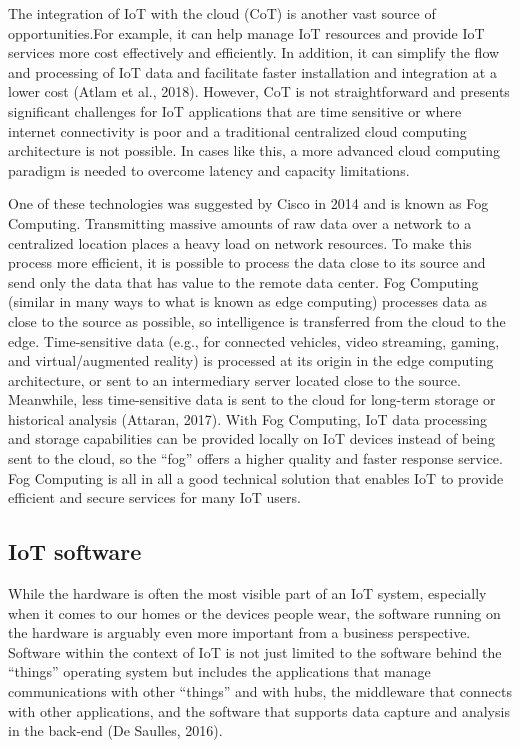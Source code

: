 \documentclass[
  letterpaper,
  DIV=11,
  numbers=noendperiod]{scrreprt}
\begin{document}
The integration of IoT with the cloud (CoT) is another vast source of
opportunities.For example, it can help manage IoT resources and provide
IoT services more cost effectively and efficiently. In addition, it can
simplify the flow and processing of IoT data and facilitate faster
installation and integration at a lower cost (Atlam et al., 2018).
However, CoT is not straightforward and presents significant challenges
for IoT applications that are time sensitive or where internet
connectivity is poor and a traditional centralized cloud computing
architecture is not possible. In cases like this, a more advanced cloud
computing paradigm is needed to overcome latency and capacity
limitations.

One of these technologies was suggested by Cisco in 2014 and is known as
Fog Computing. Transmitting massive amounts of raw data over a network
to a centralized location places a heavy load on network resources. To
make this process more efficient, it is possible to process the data
close to its source and send only the data that has value to the remote
data center. Fog Computing (similar in many ways to what is known as
edge computing) processes data as close to the source as possible, so
intelligence is transferred from the cloud to the edge. Time-sensitive
data (e.g., for connected vehicles, video streaming, gaming, and
virtual/augmented reality) is processed at its origin in the edge
computing architecture, or sent to an intermediary server located close
to the source. Meanwhile, less time-sensitive data is sent to the cloud
for long-term storage or historical analysis (Attaran, 2017). With Fog
Computing, IoT data processing and storage capabilities can be provided
locally on IoT devices instead of being sent to the cloud, so the
``fog'' offers a higher quality and faster response service. Fog
Computing is all in all a good technical solution that enables IoT to
provide efficient and secure services for many IoT users.

\hypertarget{iot-software}{%
\subsection{IoT software}\label{iot-software}}

While the hardware is often the most visible part of an IoT system,
especially when it comes to our homes or the devices people wear, the
software running on the hardware is arguably even more important from a
business perspective. Software within the context of IoT is not just
limited to the software behind the ``things'' operating system but
includes the applications that manage communications with other
``things'' and with hubs, the middleware that connects with other
applications, and the software that supports data capture and analysis
in the back-end (De Saulles, 2016).
\end{document}
